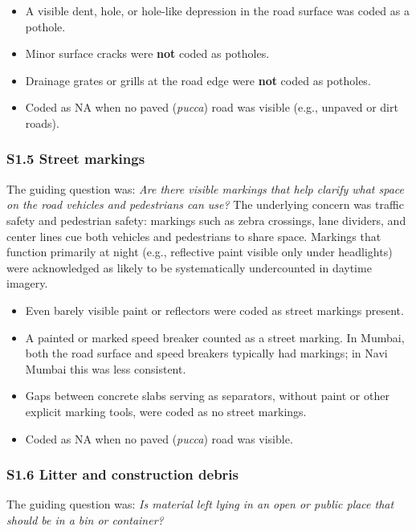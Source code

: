 \documentclass[12pt]{article}
\begin{document}
\begin{itemize}[nosep]
\item A visible dent, hole, or hole-like depression in the road surface was coded as a pothole.
\item Minor surface cracks were \textbf{not} coded as potholes.
\item Drainage grates or grills at the road edge were \textbf{not} coded as potholes.
\item Coded as NA when no paved (\textit{pucca}) road was visible (e.g., unpaved or dirt roads).
\end{itemize}

\subsubsection*{S1.5 Street markings}

The guiding question was: \textit{Are there visible markings that help clarify what space on the road vehicles and pedestrians can use?} The underlying concern was traffic safety and pedestrian safety: markings such as zebra crossings, lane dividers, and center lines cue both vehicles and pedestrians to share space. Markings that function primarily at night (e.g., reflective paint visible only under headlights) were acknowledged as likely to be systematically undercounted in daytime imagery.

\begin{itemize}[nosep]
\item Even barely visible paint or reflectors were coded as street markings present.
\item A painted or marked speed breaker counted as a street marking. In Mumbai, both the road surface and speed breakers typically had markings; in Navi Mumbai this was less consistent.
\item Gaps between concrete slabs serving as separators, without paint or other explicit marking tools, were coded as no street markings.
\item Coded as NA when no paved (\textit{pucca}) road was visible.
\end{itemize}

\subsubsection*{S1.6 Litter and construction debris}

The guiding question was: \textit{Is material left lying in an open or public place that should be in a bin or container?}
\end{document}
